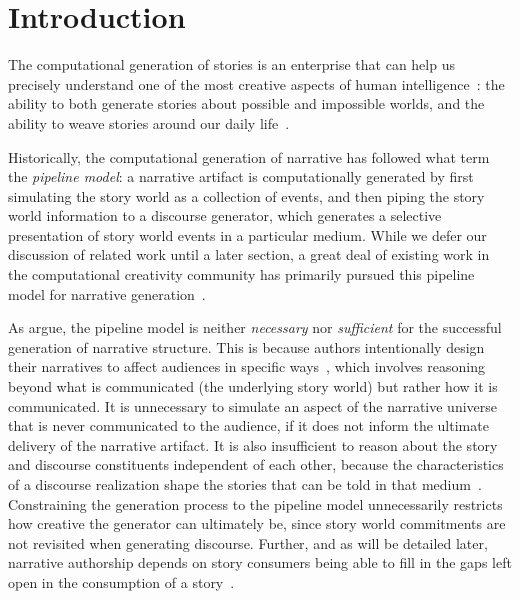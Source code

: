 \section{Introduction}

The computational generation of stories is an enterprise that can help us
precisely understand one of the most creative aspects of human
intelligence~\cite{boyd2009origin}: the ability to both generate stories about
possible and impossible worlds, and the ability to weave stories around our
daily life~\cite{herman2013storytelling}.

Historically, the computational generation of narrative has followed what
 term the \emph{pipeline model}: a narrative artifact is
computationally generated by first simulating the story world as a collection of
events, and then piping the story world information to a discourse generator,
which generates a selective presentation of story world events in a particular
medium. While we defer our discussion of related work until a later section,
a great deal of existing work in the computational creativity community has
primarily pursued this pipeline model for narrative
generation~\cite{gervas2009computational}. 

As \citeauthor{ronfard2014story} argue, the pipeline model is neither
\emph{necessary} nor \emph{sufficient} for the successful generation of
narrative structure. This is because authors intentionally design their
narratives to affect audiences in specific
ways~\cite{chatman1980story,bordwell1989making}, which involves reasoning beyond
what is communicated (the underlying story world) but rather how it is
communicated. It is unnecessary to simulate an aspect of the narrative universe
that is never communicated to the audience, if it does not inform the ultimate
delivery of the narrative artifact. It is also insufficient to reason
about the story and discourse constituents independent of each other, because
the characteristics of a discourse realization shape the stories that can be
told in that medium~\cite{herman2004toward}. Constraining the generation process
to the pipeline model unnecessarily restricts how creative the generator can
ultimately be, since story world commitments are not revisited when generating
discourse. Further, and as will be detailed later, narrative authorship depends
on story consumers being able to fill in the gaps left open in the
consumption of a story~\cite{saraceni2016relatedness,magliano2016filling}.

